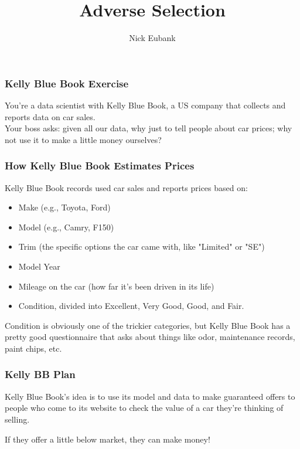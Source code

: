 \documentclass[12pt]{beamer}
\title{Adverse Selection}
\author{Nick Eubank}
\date{\vspace*{.3in} \date}
\begin{document}

\begin{frame}[c]\frametitle{Kelly Blue Book Exercise}
You're a data scientist with Kelly Blue Book, a US company that collects and reports data on car sales. \\[1em]

Your boss asks: given all our data, why just to \alert{tell} people about car prices; why not use it to make a little money ourselves?
\end{frame}

\begin{frame}
    \frametitle{How Kelly Blue Book Estimates Prices}

Kelly Blue Book records used car sales and reports prices based on:


\begin{itemize}
\item Make (e.g., Toyota, Ford)
\item Model (e.g., Camry, F150)
\item Trim (the specific options the car came with, like "Limited" or "SE")
\item Model Year
\item Mileage on the car (how far it's been driven in its life)
\item Condition, divided into Excellent, Very Good, Good, and Fair.
\end{itemize}
\pause Condition is obviously one of the trickier categories, but Kelly Blue Book has a pretty good questionnaire that asks about things like odor, maintenance records, paint chips, etc.
\end{frame}

\begin{frame}
    \frametitle{Kelly BB Plan}
Kelly Blue Book's idea is to use its model and data to make guaranteed offers to people who come to its website to check the value of a car they're thinking of selling.

If they offer a little below market, they can make money!
\end{frame}

\begin{frame}
    \frametitle{}
    \centering
        \hspace{-1.5cm}
\end{frame}
\end{document}
